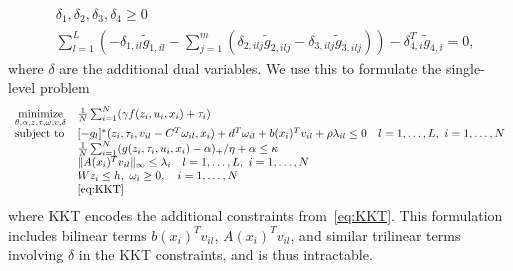 \documentclass[11pt]{article}
\newcommand{\bsnote}[1]{\noindent\textcolor{red}{\texttt{Bartolomeo: #1}}}
\begin{document}
\begin{appendices}
\begin{equation}
\begin{aligned}
&\delta_1,\delta_2,\delta_3,\delta_4 \geq 0\\
& \sum_{l=1}^{L} \left (-\delta_{1,il}\tilde{g}_{1,il} -\sum_{j=1}^{m} (\delta_{2,ilj}\tilde{g}_{2,ilj} -\delta_{3,ilj}\tilde{g}_{3,ilj})\right ) -\delta_{4,i}^T\tilde{g}_{4,i} = 0,
\end{aligned}
\end{equation}
where $\delta$ are the additional dual variables. We use this to formulate the single-level problem
\begin{equation}
	\begin{array}{ll}
			\label{eq:singlelevel-bilinear}
 \underset{\theta,\alpha,z,\tau,\omega,v,\delta}{\mbox{minimize}} & \frac{1}{N}\sum_{i=1}^N (\gamma f(z_i,u_i,x_i) +\tau_i )\\
		\mbox{subject to} 
        &[-g_l]^*(z_i,\tau_i,v_{il}-C^T\omega_{il},x_i) + 
        d^T\omega_{il} + b(x_i)^Tv_{il} + \rho\lambda_{il} \leq 0 \quad l = 1,\dots,L,~i=1,\dots,N \\
        &  \frac{1}{N}\sum_{i=1}^N (g(z_i,\tau_i,u_i,x_i)- \alpha)_+/\eta + \alpha \leq \kappa \\
 & \|A(x_i)^Tv_{il}\|_\infty \leq \lambda_{i} \quad l = 1,\dots,L,~i=1,\dots,N\\
    & Wz_i \leq h,~\omega_i \geq 0,\quad i = 1,\dots,N\\
        & \eqref{eq:KKT}
	\end{array}
\end{equation}
where KKT encodes the additional constraints from~\eqref{eq:KKT}.
This formulation includes bilinear terms $b(x_i)^Tv_{il}$, $A(x_i)^Tv_{il}$, and similar trilinear terms involving $\delta$ in the KKT constraints, and is thus intractable.







\end{appendices}
\end{document}
